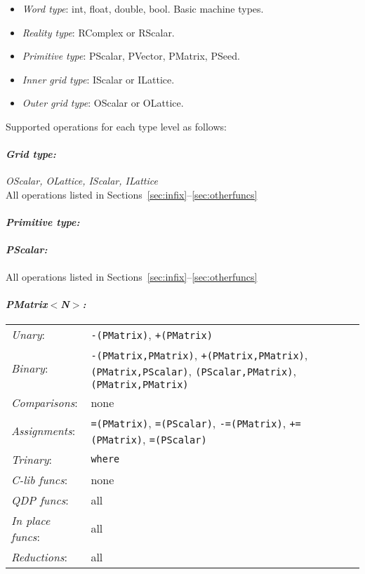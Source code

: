 \documentclass[12pt,letterpaper]{article}
\begin{document}
\begin{itemize}
\item {\em Word type}: 
  int, float, double, bool. Basic machine types.
\item {\em Reality type}: 
  RComplex or RScalar. 
\item {\em Primitive type}: 
  PScalar, PVector, PMatrix, PSeed. 
\item {\em Inner grid type}: 
  IScalar or ILattice. 
\item {\em Outer grid type}:
  OScalar or OLattice. 
\end{itemize}

\noindent
Supported operations for each type level as follows:

\paragraph{\bf\em Grid type:} {\em OScalar, OLattice, IScalar, ILattice}\\
All operations listed in Sections~\ref{sec:infix}--\ref{sec:otherfuncs}

\paragraph{\bf\em Primitive type:}
\paragraph{\bf\em PScalar:}
All operations listed in Sections~\ref{sec:infix}--\ref{sec:otherfuncs}

\paragraph{\bf\em PMatrix$<$N$>$:}
\begin{flushleft}
  \begin{tabular}{lp{5.0in}}
  {\em Unary}:& {\tt -(PMatrix)}, {\tt +(PMatrix)}\\
  {\em Binary}:& {\tt -(PMatrix,PMatrix)}, {\tt +(PMatrix,PMatrix)}, 
       {\tt *(PMatrix,PScalar)}, {\tt *(PScalar,PMatrix)}, {\tt *(PMatrix,PMatrix)}\\
  {\em Comparisons}:& none\\
  {\em Assignments}:& {\tt =(PMatrix)}, {\tt =(PScalar)}, {\tt -=(PMatrix)}, 
       {\tt +=(PMatrix)}, {\tt *=(PScalar)}\\
  {\em Trinary}:& {\tt where}\\
  {\em C-lib funcs}:& none\\
  {\em QDP funcs}:& all\\
  {\em In place funcs}:& all\\
  {\em Reductions}:& all\\
  \end{tabular}
\end{flushleft}
\end{document}
